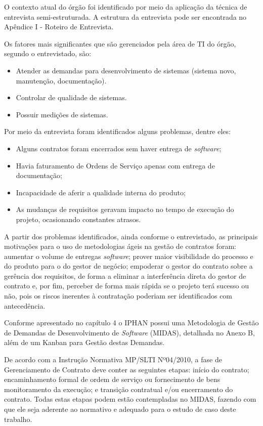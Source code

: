 O contexto atual do órgão foi identificado por meio da aplicação da técnica de entrevista semi-estruturada. A estrutura da entrevista pode ser encontrada no Apêndice I -  Roteiro de Entrevista.

Os fatores mais significantes que são gerenciados pela área de TI do órgão, segundo o entrevistado, são:
\begin{itemize}
\item Atender as demandas para desenvolvimento de sistemas (sistema novo, manutenção, documentação).
\item Controlar de qualidade de sistemas.
\item Possuir medições de sistemas.
\end{itemize}

Por meio da entrevista foram identificados alguns problemas, dentre eles:
\begin{itemize}
\item Alguns contratos foram encerrados sem haver entrega de \textit{software};
\item Havia faturamento de Ordens de Serviço apenas com entrega de documentação;
\item Incapacidade de aferir a qualidade interna do produto;
\item As mudanças de requisitos geravam impacto no tempo de execução do projeto, ocasionando constantes atrasos.
\end{itemize}

A partir dos problemas identificados, ainda conforme o entrevistado, as principais motivações para o uso de metodologias ágeis na gestão de contratos foram: aumentar o volume de entregas \textit{software}; prover maior visibilidade do processo e do produto para o do gestor de negócio; empoderar o gestor do contrato sobre a gerência dos requisitos, de forma a eliminar  a interferência direta do gestor de contrato e, por fim, perceber de forma mais rápida se o projeto terá sucesso ou não, pois os riscos inerentes à contratação poderiam ser identificados com antecedência.

Conforme apresentado no capítulo 4 o IPHAN possui uma Metodologia de Gestão de Demandas de Desenvolvimento de \textit{Software} (MIDAS), detalhada no Anexo B, além de um Kanban para Gestão destas Demandas. 

De acordo com a Instrução Normativa MP/SLTI Nº04/2010, a fase de Gerenciamento de Contrato deve conter as seguintes etapas: início do contrato; encaminhamento formal de ordem de serviço ou fornecimento de bens  monitoramento da execução; e transição contratual e/ou encerramento do contrato. Todas estas etapas podem estão contempladas no MIDAS, fazendo com que ele seja aderente ao normativo e adequado para o estudo de caso deste trabalho.

